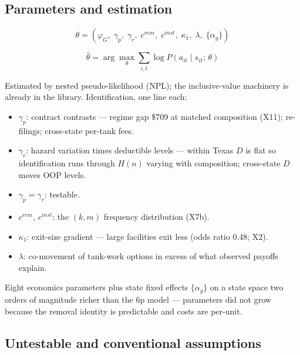 \documentclass[
  letterpaper,
  DIV=11,
  numbers=noendperiod]{scrartcl}
\providecommand{\tightlist}{%
  \setlength{\itemsep}{0pt}\setlength{\parskip}{0pt}}\usepackage{longtable,booktabs,array}
\begin{document}
\subsection{Parameters and estimation}\label{parameters-and-estimation}

\[
\theta = \left(\varphi_G,\; \gamma_p,\; \gamma_r,\; c^{rem},\; c^{inst},\;
\kappa_1,\; \lambda,\; \{\alpha_g\}\right)
\]

\[
\hat\theta = \arg\max_\theta \sum_{i,t} \log P\!\left(a_{it} \mid s_{it};\,
\theta\right)
\]

Estimated by nested pseudo-likelihood (NPL); the inclusive-value
machinery is already in the library. Identification, one line each:

\begin{itemize}
\tightlist
\item
  \(\gamma_p\): contract contrasts --- regime gap \$709 at matched
  composition (X11); re-filings; cross-state per-tank fees.
\item
  \(\gamma_r\): hazard variation times deductible levels --- within
  Texas \(D\) is flat so identification runs through \(H(n)\) varying
  with composition; cross-state \(D\) moves OOP levels.
\item
  \(\gamma_p = \gamma_r\): testable.
\item
  \(c^{rem},\, c^{inst}\): the \((k,m)\) frequency distribution (X7b).
\item
  \(\kappa_1\): exit-size gradient --- large facilities exit less (odds
  ratio 0.48; X2).
\item
  \(\lambda\): co-movement of tank-work options in excess of what
  observed payoffs explain.
\end{itemize}

Eight economics parameters plus state fixed effects \(\{\alpha_g\}\) on
a state space two orders of magnitude richer than the 6p model ---
parameters did not grow because the removal identity is predictable and
costs are per-unit.

\subsection{Untestable and conventional
assumptions}\label{untestable-and-conventional-assumptions}
\end{document}
